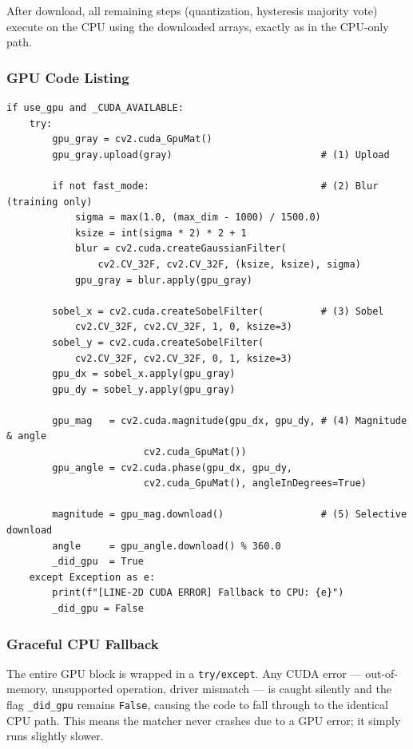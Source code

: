\documentclass[12pt,a4paper]{article}
\begin{document}
After download, all remaining steps (quantization, hysteresis majority vote) execute
on the CPU using the downloaded arrays, exactly as in the CPU-only path.

\subsubsection{GPU Code Listing}

\begin{lstlisting}[style=python,
  caption={GPU path inside \texttt{\_quantize\_gradients()}},
  label={lst:cuda_path}]
if use_gpu and _CUDA_AVAILABLE:
    try:
        gpu_gray = cv2.cuda_GpuMat()
        gpu_gray.upload(gray)                          # (1) Upload

        if not fast_mode:                              # (2) Blur (training only)
            sigma = max(1.0, (max_dim - 1000) / 1500.0)
            ksize = int(sigma * 2) * 2 + 1
            blur = cv2.cuda.createGaussianFilter(
                cv2.CV_32F, cv2.CV_32F, (ksize, ksize), sigma)
            gpu_gray = blur.apply(gpu_gray)

        sobel_x = cv2.cuda.createSobelFilter(          # (3) Sobel
            cv2.CV_32F, cv2.CV_32F, 1, 0, ksize=3)
        sobel_y = cv2.cuda.createSobelFilter(
            cv2.CV_32F, cv2.CV_32F, 0, 1, ksize=3)
        gpu_dx = sobel_x.apply(gpu_gray)
        gpu_dy = sobel_y.apply(gpu_gray)

        gpu_mag   = cv2.cuda.magnitude(gpu_dx, gpu_dy, # (4) Magnitude & angle
                        cv2.cuda_GpuMat())
        gpu_angle = cv2.cuda.phase(gpu_dx, gpu_dy,
                        cv2.cuda_GpuMat(), angleInDegrees=True)

        magnitude = gpu_mag.download()                 # (5) Selective download
        angle     = gpu_angle.download() % 360.0
        _did_gpu  = True
    except Exception as e:
        print(f"[LINE-2D CUDA ERROR] Fallback to CPU: {e}")
        _did_gpu = False
\end{lstlisting}

\subsubsection{Graceful CPU Fallback}
The entire GPU block is wrapped in a \texttt{try/except}.  Any CUDA error ---
out-of-memory, unsupported operation, driver mismatch --- is caught silently and the
flag \texttt{\_did\_gpu} remains \texttt{False}, causing the code to fall through to
the identical CPU path.  This means the matcher never crashes due to a GPU error;
it simply runs slightly slower.
\end{document}
